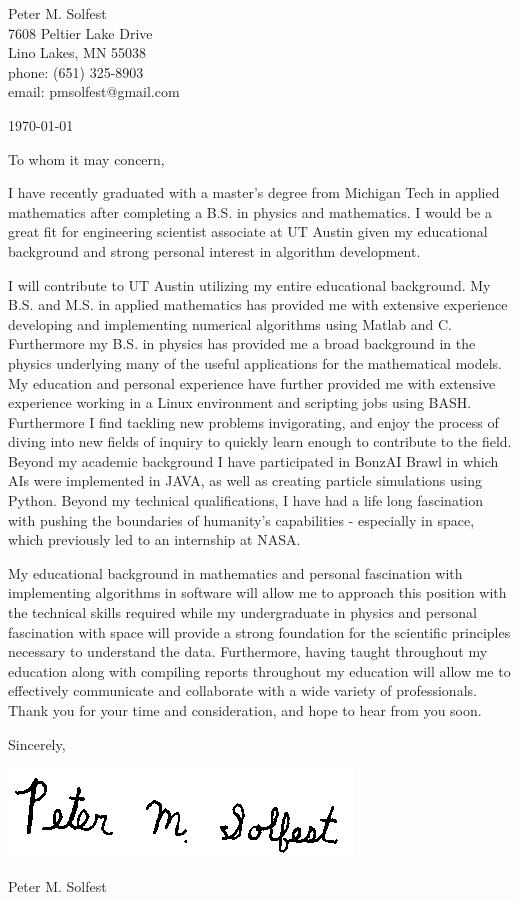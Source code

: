 \documentclass[letterpaper,12pt]{article}
\begin{document}
Peter M. Solfest\\
7608 Peltier Lake Drive\\
Lino Lakes, MN 55038\\
phone: (651) 325-8903\\
email: pmsolfest@gmail.com

\today

To whom it may concern,

I have recently graduated with a master's degree from Michigan Tech in applied mathematics after
completing a B.S. in physics and mathematics.
I would be a great fit for engineering scientist associate
at UT Austin given my educational background
and strong personal interest in algorithm development.

I will contribute to UT Austin utilizing my entire educational background.
My B.S. and M.S. in applied mathematics has provided me with extensive experience developing
and implementing numerical algorithms using Matlab and C.
Furthermore my B.S. in physics has provided me a broad background in the physics
underlying many of the useful applications for the mathematical models.
My education and personal experience have further provided me with
extensive experience working in a Linux environment and scripting
jobs using BASH.
Furthermore I find tackling new problems invigorating, and enjoy
the process of diving into new fields of inquiry to quickly learn
enough to contribute to the field.
Beyond my academic background I have participated in BonzAI Brawl in which
AIs were implemented in JAVA, as well as
creating particle simulations using Python.
%
Beyond my technical qualifications, I have had a life long fascination with
pushing the boundaries of humanity's capabilities - especially in space, which
previously led to an internship at NASA.

My educational background in mathematics and personal fascination
with implementing algorithms in software will allow 
me to approach this position with the technical skills required
while my undergraduate in physics and personal fascination with space
will provide a strong foundation for the scientific principles necessary
to understand the data.
Furthermore, having taught throughout my education along with compiling reports
throughout my education will allow me to effectively communicate and
collaborate with a wide variety of professionals.
Thank you for your time and consideration, and hope to hear from you soon.


Sincerely,

\includegraphics[height=.5in]{signature.png}

Peter M. Solfest
\end{document}
